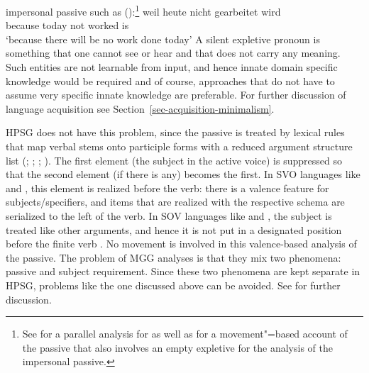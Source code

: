 \documentclass[output=paper
 	        ,biblatex
                ,babelshorthands
                ,newtxmath
                ,draftmode
                ,colorlinks, citecolor=brown
]{langscibook}
\begin{document}
impersonal passive such as ():\footnote{%
	See  for a parallel analysis for  as well as 
	 for a movement"=based account of the passive that also involves an
        empty expletive for the analysis of the impersonal passive.
}
\ea
\gll weil heute nicht gearbeitet wird\\
     because today not worked is\\
\glt `because there will be no work done today'
\z
A silent expletive pronoun is something that one cannot see or hear and that does not carry any
meaning. Such entities are not learnable from input, and hence innate domain specific knowledge would
be required and of course, approaches that do not have to assume very specific innate knowledge are
preferable. For further discussion of language acquisition see Section~\ref{sec-acquisition-minimalism}.%

HPSG does not have this problem, since the passive is treated by lexical rules that map verbal stems onto
participle forms with a reduced argument structure list (\citealt[]{ps};
\citealt{Mueller2003e}; \citealt{MOe2013a}; ). The first element (the subject in the
active voice) is suppressed so that the second element (if there is any) becomes the first. In SVO languages
like  and , this element is realized before the verb: there is a valence feature for
subjects/specifiers, and items that are realized with the respective schema are serialized to the
left of the verb. In SOV languages like  and , the subject is treated like other arguments,
and hence it is not put in a designated position before the finite verb . No movement is
involved in this valence-based analysis of the passive. The problem of MGG analyses is that they mix two phenomena: passive and subject
requirement. Since these two phenomena are kept separate in HPSG, problems like the one discussed
above can be avoided. See  for further discussion.

\end{document}
